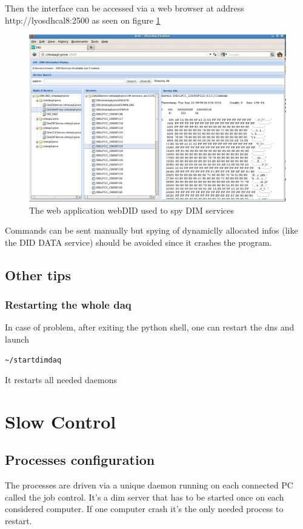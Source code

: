 \documentclass[english]{article}
\begin{document}
Then the interface can be accessed via a web browser at address http://lyosdhcal8:2500 as seen on figure \ref{webdid}
\begin{figure}[htp]
\centering
\includegraphics[width=1.3\textwidth]{./webDid.png}
\caption{The web application webDID used to spy DIM services}
\label{webdid}
\end{figure}

Commands can be sent manually but spying of dynamiclly allocated infos (like the DID DATA service) should be avoided since it crashes the program. 
\subsection{Other tips}
\subsubsection{Restarting the whole daq}
In case of problem, after exiting the python shell, one can restart the dns and launch
\begin{verbatim}
~/startdimdaq
\end{verbatim}
It restarts all needed daemons

\section{Slow Control}
\subsection{Processes configuration}
The processes are driven via a unique daemon running on each connected PC called the job control. It's a dim server that has to be started once on each considered computer. If one computer crash it's the only needed process to restart.
\end{document}
